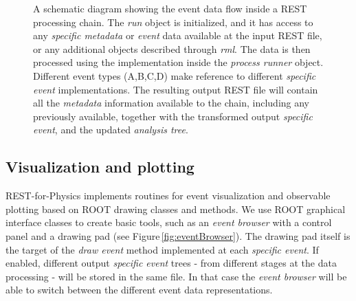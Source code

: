 \begin{figure}[htb!]
  \centering
	\caption{A schematic diagram showing the event data flow inside a REST processing chain. The \emph{run} object is initialized, and it has access to any \emph{specific metadata} or \emph{event} data available at the input REST file, or any additional objects described through \emph{rml}. The data is then processed using the implementation inside the \emph{process runner} object. Different event types (A,B,C,D) make reference to different \emph{specific event} implementations. The resulting output REST file will contain all the \emph{metadata} information available to the chain, including any previously available, together with the transformed output \emph{specific event}, and the updated \emph{analysis tree}.  }\label{fig:processing}
\end{figure}

\subsection{Visualization and plotting}

REST-for-Physics implements routines for event visualization and observable plotting based on ROOT drawing classes and methods. We use ROOT graphical interface classes to create basic tools, such as an \emph{event browser} with a control panel and a drawing pad (see Figure\,\ref{fig:eventBrowser}). The drawing pad itself is the target of the \emph{draw event} method implemented at each \emph{specific event}. If enabled, different output \emph{specific event} trees - from different stages at the data processing - will be stored in the same file. In that case the \emph{event browser} will be able to switch between the different event data representations.

